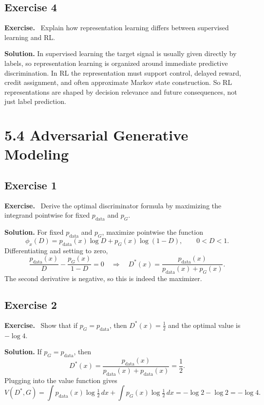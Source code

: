 \documentclass[11pt]{article}
\newenvironment{exercisebox}{\begin{framed}\noindent\textbf{Exercise.}\ }{\end{framed}}
\begin{document}
\subsection*{Exercise 4}
\begin{exercisebox}
Explain how representation learning differs between supervised learning and RL.
\end{exercisebox}
\textbf{Solution.} In supervised learning the target signal is usually given directly by labels, so representation learning is organized around immediate predictive discrimination. In RL the representation must support control, delayed reward, credit assignment, and often approximate Markov state construction. So RL representations are shaped by decision relevance and future consequences, not just label prediction.

\section{5.4 Adversarial Generative Modeling}
\subsection*{Exercise 1}
\begin{exercisebox}
Derive the optimal discriminator formula by maximizing the integrand pointwise for fixed $p_{\mathrm{data}}$ and $p_G$.
\end{exercisebox}
\textbf{Solution.} For fixed $p_{\mathrm{data}}$ and $p_G$, maximize pointwise the function
\[
\phi_x(D)=p_{\mathrm{data}}(x)\log D + p_G(x)\log(1-D),\qquad 0<D<1.
\]
Differentiating and setting to zero,
\[
\frac{p_{\mathrm{data}}(x)}{D}-\frac{p_G(x)}{1-D}=0
\quad\Longrightarrow\quad
D^*(x)=\frac{p_{\mathrm{data}}(x)}{p_{\mathrm{data}}(x)+p_G(x)}.
\]
The second derivative is negative, so this is indeed the maximizer.

\subsection*{Exercise 2}
\begin{exercisebox}
Show that if $p_G=p_{\mathrm{data}}$, then $D^*(x)=\tfrac12$ and the optimal value is $-\log 4$.
\end{exercisebox}
\textbf{Solution.} If $p_G=p_{\mathrm{data}}$, then
\[
D^*(x)=\frac{p_{\mathrm{data}}(x)}{p_{\mathrm{data}}(x)+p_{\mathrm{data}}(x)}=\frac12.
\]
Plugging into the value function gives
\[
V(D^*,G)=\int p_{\mathrm{data}}(x)\log \tfrac12\,dx + \int p_G(x)\log \tfrac12\,dx = -\log 2 - \log 2 = -\log 4.
\]
\end{document}
